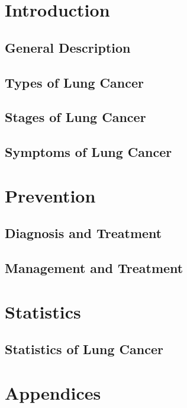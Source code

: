 


\coverpage{\TITLE}{\SUBTITLE}{\AUTHOR}{\DATE}{\SUBJECT}
\newpage
\fpage
\newpage

\tableofcontents


\part{Introduction}
\chapter{General Description}


\chapter{Types of Lung Cancer}


\chapter{Stages of Lung Cancer}


\chapter{Symptoms of Lung Cancer}


\part{Prevention}

\chapter{Diagnosis and Treatment}


\chapter{Management and Treatment}



\part{Statistics}
\chapter{Statistics of Lung Cancer}


\part{Appendices}
\listoffigures
\newpage\printbibliography[title = {References}]

